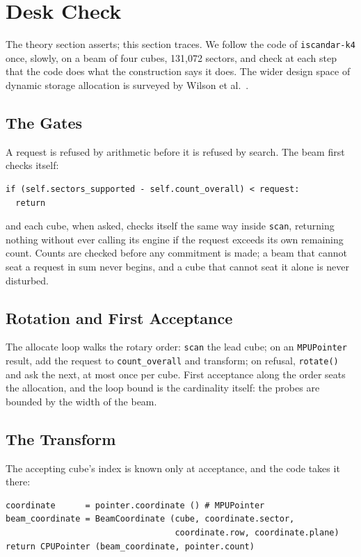\documentclass{article}
\begin{document}
\section{Desk Check}

The theory section asserts; this section traces. We follow the code of \texttt{iscandar-k4} once, slowly, on a beam of four cubes, 131,072 sectors, and check at each step that the code does what the construction says it does. The wider design space of dynamic storage allocation is surveyed by Wilson et al.~\cite{wilson1995dynamic}.

\subsection{The Gates}

A request is refused by arithmetic before it is refused by search. The beam first checks itself:

\begin{verbatim}
if (self.sectors_supported - self.count_overall) < request:
  return
\end{verbatim}

and each cube, when asked, checks itself the same way inside \texttt{scan}, returning nothing without ever calling its engine if the request exceeds its own remaining count. Counts are checked before any commitment is made; a beam that cannot seat a request in sum never begins, and a cube that cannot seat it alone is never disturbed.

\subsection{Rotation and First Acceptance}

The allocate loop walks the rotary order: \texttt{scan} the lead cube; on an \texttt{MPUPointer} result, add the request to \texttt{count\_overall} and transform; on refusal, \texttt{rotate()} and ask the next, at most once per cube. First acceptance along the order seats the allocation, and the loop bound is the cardinality itself: the probes are bounded by the width of the beam.

\subsection{The Transform}

The accepting cube's index is known only at acceptance, and the code takes it there:

\begin{verbatim}
coordinate      = pointer.coordinate () # MPUPointer
beam_coordinate = BeamCoordinate (cube, coordinate.sector,
                                  coordinate.row, coordinate.plane)
return CPUPointer (beam_coordinate, pointer.count)
\end{verbatim}
\end{document}
